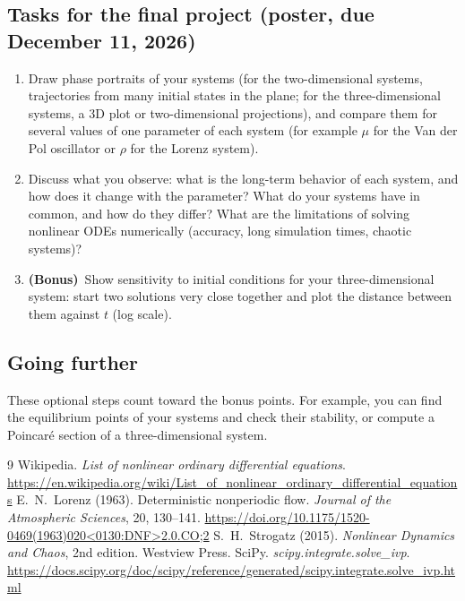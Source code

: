 \documentclass[11pt,a4paper]{article}
\newcommand{\bonus}{\textbf{(Bonus)}}
\begin{document}
\subsection*{Tasks for the final project (poster, due December 11, 2026)}
\begin{enumerate}
  \item Draw phase portraits of your systems (for the two-dimensional
        systems, trajectories from many initial states in the plane; for the
        three-dimensional systems, a 3D plot or two-dimensional projections),
        and compare them for several values of one parameter of each system
        (for example $\mu$ for the Van der Pol oscillator or $\rho$ for the
        Lorenz system).
  \item Discuss what you observe: what is the long-term behavior of each
        system, and how does it change with the parameter? What do your
        systems have in common, and how do they differ? What are the limitations of solving nonlinear
        ODEs numerically (accuracy, long simulation times, chaotic
        systems)?
  \item \bonus\ Show sensitivity to initial conditions for your
        three-dimensional system: start two solutions very close together
        and plot the distance between them against $t$ (log scale).
\end{enumerate}

\subsection*{Going further}
These optional steps count toward the bonus points. For example, you can find
the equilibrium points of your systems and check their stability, or compute
a Poincar\'e section of a three-dimensional system.

\begin{thebibliography}{9}
   Wikipedia. \emph{List of nonlinear ordinary differential
    equations}.
    \url{https://en.wikipedia.org/wiki/List_of_nonlinear_ordinary_differential_equations}
   E.~N.~Lorenz (1963). Deterministic nonperiodic flow.
    \emph{Journal of the Atmospheric Sciences}, 20, 130--141.
    \url{https://doi.org/10.1175/1520-0469(1963)020<0130:DNF>2.0.CO;2}
   S.~H.~Strogatz (2015). \emph{Nonlinear Dynamics and
    Chaos}, 2nd edition. Westview Press.
   SciPy. \emph{scipy.integrate.solve\_ivp}.
    \url{https://docs.scipy.org/doc/scipy/reference/generated/scipy.integrate.solve_ivp.html}
\end{thebibliography}
\end{document}
